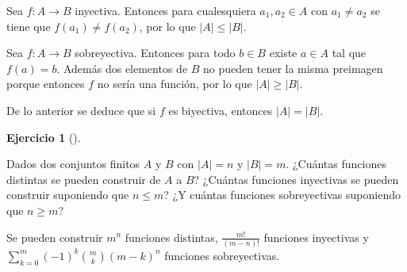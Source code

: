 \documentclass[
  spanish,
  a4paper,
]{scrreport}
\theoremstyle{definition}
\newtheorem{exercise}{Ejercicio}[chapter]
\theoremstyle{remark}
\begin{document}
\begin{tcolorbox}[enhanced jigsaw, arc=.35mm, bottomrule=.15mm, bottomtitle=1mm, breakable, colback=white, colbacktitle=quarto-callout-tip-color!10!white, colframe=quarto-callout-tip-color-frame, coltitle=black, left=2mm, leftrule=.75mm, opacityback=0, opacitybacktitle=0.6, rightrule=.15mm, title=\textcolor{quarto-callout-tip-color}{\faLightbulb}\hspace{0.5em}{Solución}, titlerule=0mm, toprule=.15mm, toptitle=1mm]

Sea \(f:A\rightarrow B\) inyectiva. Entonces para cualesquiera
\(a_1,a_2\in A\) con \(a_1\neq a_2\) se tiene que \(f(a_1)\neq f(a_2)\),
por lo que \(|A|\leq |B|\).

Sea \(f:A\rightarrow B\) sobreyectiva. Entonces para todo \(b\in B\)
existe \(a\in A\) tal que \(f(a)=b\). Además dos elementos de \(B\) no
pueden tener la misma preimagen porque entonces \(f\) no sería una
función, por lo que \(|A|\geq |B|\).

De lo anterior se deduce que si \(f\) es biyectiva, entonces
\(|A|=|B|\).

\end{tcolorbox}

\begin{exercise}[]\protect\hypertarget{exr-numero-funciones-inyectivas}{}\label{exr-numero-funciones-inyectivas}

Dados dos conjuntos finitos \(A\) y \(B\) con \(|A|=n\) y \(|B|=m\).
¿Cuántas funciones distintas se pueden construir de \(A\) a \(B\)?
¿Cuántas funciones inyectivas se pueden construir suponiendo que
\(n\leq m\)? ¿Y cuántas funciones sobreyectivas suponiendo que
\(n\geq m\)?

\end{exercise}

\begin{tcolorbox}[enhanced jigsaw, arc=.35mm, bottomrule=.15mm, bottomtitle=1mm, breakable, colback=white, colbacktitle=quarto-callout-tip-color!10!white, colframe=quarto-callout-tip-color-frame, coltitle=black, left=2mm, leftrule=.75mm, opacityback=0, opacitybacktitle=0.6, rightrule=.15mm, title=\textcolor{quarto-callout-tip-color}{\faLightbulb}\hspace{0.5em}{Solución}, titlerule=0mm, toprule=.15mm, toptitle=1mm]

Se pueden construir \(m^n\) funciones distintas, \(\frac{m!}{(m-n)!}\)
funciones inyectivas y \(\sum_{k=0}^m (-1)^k \binom{m}{k} (m-k)^n\)
funciones sobreyectivas.

\end{tcolorbox}
\end{document}
